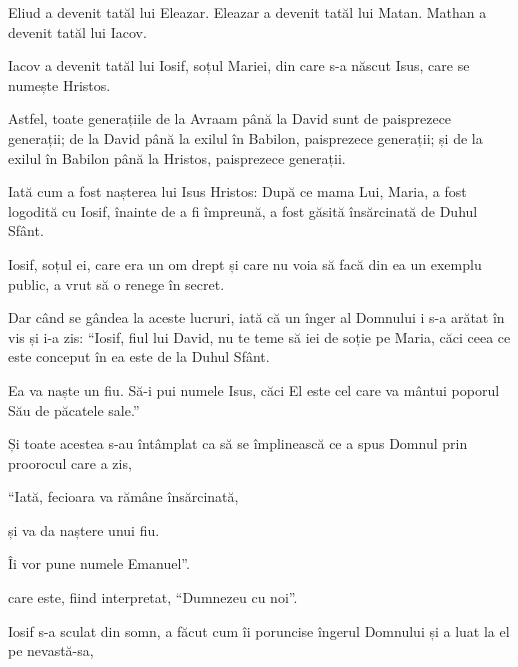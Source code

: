 {Eliud a devenit tatăl lui Eleazar. Eleazar a devenit tatăl lui Matan. Mathan a devenit tatăl lui Iacov.

Iacov a devenit tatăl lui Iosif, soțul Mariei, din care s-a născut Isus,
care se numește Hristos.


\par }{\PP {}Astfel, toate generațiile de la Avraam până la David sunt de paisprezece generații; de la David până la exilul în Babilon, paisprezece generații; și de la exilul în Babilon până la Hristos, paisprezece generații.


\par }{\PP {}Iată cum a fost nașterea lui Isus Hristos: După ce mama Lui, Maria, a fost logodită cu Iosif, înainte de a fi împreună, a fost găsită însărcinată de Duhul Sfânt.

Iosif, soțul ei, care era un om drept și care nu voia să facă din ea un exemplu public, a vrut să o renege în secret.

Dar când se gândea la aceste lucruri, iată că
un înger al Domnului i s-a arătat în vis și i-a zis: “Iosif, fiul lui David, nu te teme să iei de soție pe Maria, căci ceea ce este conceput în ea este de la Duhul Sfânt.

Ea va naște un fiu. Să-i pui numele Isus,
căci El este cel care va mântui poporul Său de păcatele sale.”


\par }{\PP {}Și toate acestea s-au întâmplat ca să se împlinească ce a spus Domnul prin proorocul care a zis,


\par }{\Q {}“Iată, fecioara va rămâne însărcinată,

\par }{\QB și va da naștere unui fiu.

\par }{\Q Îi vor pune numele Emanuel”.

\par }{\QB care este, fiind interpretat, “Dumnezeu cu noi”.


\par }{\PP {}Iosif s-a sculat din somn, a făcut cum îi poruncise îngerul Domnului și a luat la el pe nevastă-sa,

}
